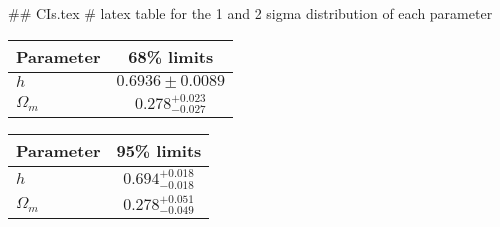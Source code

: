 ## CIs.tex
# latex table for the 1 and 2 sigma distribution of each parameter

\begin{tabular} { l  c}
 Parameter &  68\% limits\\
\hline
{\boldmath$h              $} & $0.6936\pm 0.0089          $\\
{\boldmath$\Omega_m       $} & $0.278^{+0.023}_{-0.027}   $\\
\hline
\end{tabular}

\begin{tabular} { l  c}
 Parameter &  95\% limits\\
\hline
{\boldmath$h              $} & $0.694^{+0.018}_{-0.018}   $\\
{\boldmath$\Omega_m       $} & $0.278^{+0.051}_{-0.049}   $\\
\hline
\end{tabular}
